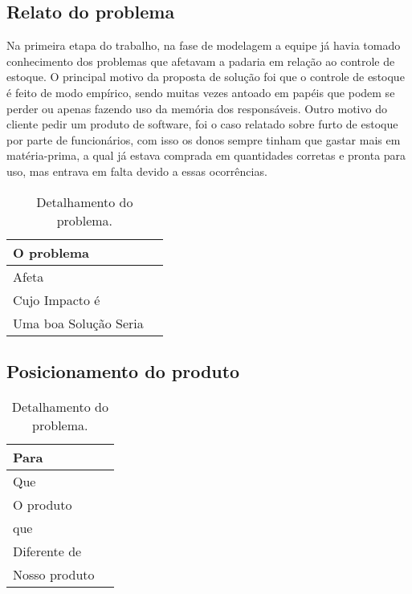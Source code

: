 \begin{appendices}
\subsection{Relato do problema}
	Na primeira etapa do trabalho, na fase de modelagem a equipe já havia tomado conhecimento dos problemas que afetavam a padaria em relação ao controle de estoque.
	O principal motivo da proposta de solução foi que o controle de estoque é feito de modo empírico, sendo muitas vezes antoado em papéis que podem se perder ou apenas fazendo uso da memória dos responsáveis. Outro motivo do cliente pedir um produto de software, foi o caso relatado sobre furto de estoque por parte de funcionários, com isso os donos sempre tinham que gastar mais em matéria-prima, a qual já estava comprada em quantidades corretas e pronta para uso, mas entrava em falta devido a essas ocorrências.

	\begin{table}[htb]
    \begin{tabular}{|l|l|}
        \hline
        O problema          & {\parbox{12cm}{}}                                        \\ \hline
        Afeta          & {\parbox{12cm}{}}                                                \\ \hline
        Cujo Impacto é            & {\parbox{12cm}{}}                                                                \\ 
        Uma boa Solução Seria             & {\parbox{12cm}{}}                         \\ \hline
    \end{tabular}
    \caption{Detalhamento do problema.}
    \end{table}


\subsection{Posicionamento do produto}

	\begin{table}[htb]
    \begin{tabular}{|l|l|}
        \hline
        Para          & {\parbox{12cm}{}}                                        \\ \hline
        Que          & {\parbox{12cm}{}}                                                \\ \hline
        O produto            & {\parbox{12cm}{}}                                                                \\ 
        que             & {\parbox{12cm}{}}                         \\ \hline
        Diferente de             & {\parbox{12cm}{}}                         \\ \hline
        Nosso produto             & {\parbox{12cm}{}}                         \\ \hline
    \end{tabular}
    \caption{Detalhamento do problema.}
    \end{table}


\end{appendices}
